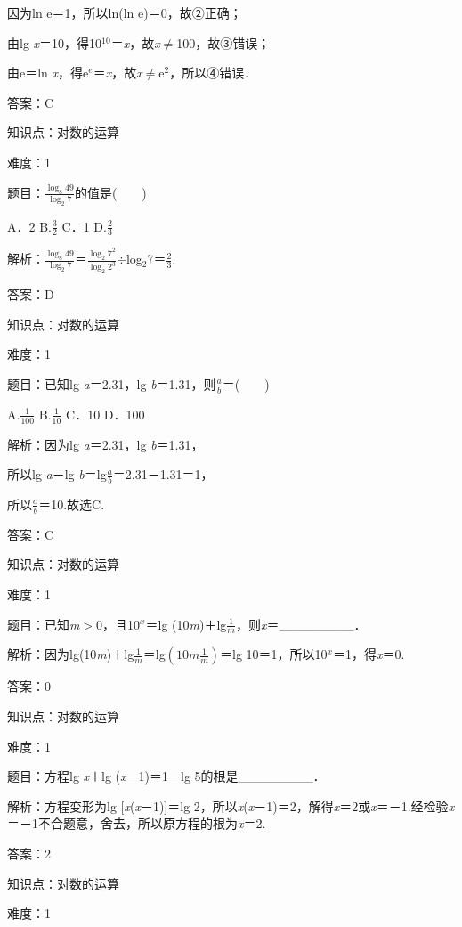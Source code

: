 \documentclass{article} %
\begin{document}
因为ln e＝1，所以ln(ln e)＝0，故②正确；

由lg \textit{x}＝10，得10${}^{10}$＝\textit{x}，故\textit{x}$\mathrm{\neq}$100，故③错误；

由e＝ln \textit{x}，得e${}^{e}$＝\textit{x}，故\textit{x}$\mathrm{\neq}$e${}^{2}$，所以④错误．

答案：C

知识点：对数的运算

难度：1

题目：$\frac{\log_8 49}{\log_2 7}$的值是(　　)

A．2  B.$\frac{3}{2}$  C．1  D.$\frac{2}{3}$

解析：$\frac{\log_8 49}{\log_2 7}$＝$\frac{\log_2 7^{2}}{\log_2 2^{3}}$$\mathrm{\div}$log${}_{2}$7＝$\frac{2}{3}$.

答案：D

知识点：对数的运算

难度：1

题目：已知lg \textit{a}＝2.31，lg \textit{b}＝1.31，则$\frac{a}{b}$＝(　　)

A.$\frac{1}{100}$  B.$\frac{1}{10}$  C．10  D．100

解析：因为lg \textit{a}＝2.31，lg \textit{b}＝1.31，

所以lg \textit{a}－lg \textit{b}＝lg$\frac{a}{b}$＝2.31－1.31＝1，

所以$\frac{a}{b}$＝10.故选C.

答案：C

知识点：对数的运算

难度：1

题目：已知\textit{m}$\mathrm{>}$0，且10\textit{${}^{x}$}＝lg (10\textit{m})＋lg$\frac{1}{m}$，则\textit{x}＝\_\_\_\_\_\_\_\_．

解析：因为lg(10\textit{m})＋lg$\frac{1}{m}$＝lg$(10m\frac{1}{m})$＝lg 10＝1，所以10\textit{${}^{x}$}＝1，得\textit{x}＝0.

答案：0

知识点：对数的运算

难度：1

题目：方程lg \textit{x}＋lg (\textit{x}－1)＝1－lg 5的根是\_\_\_\_\_\_\_\_．

解析：方程变形为lg [\textit{x}(\textit{x}－1)]＝lg 2，所以\textit{x}(\textit{x}－1)＝2，解得\textit{x}＝2或\textit{x}＝－1.经检验\textit{x}＝－1不合题意，舍去，所以原方程的根为\textit{x}＝2.

答案：2

知识点：对数的运算

难度：1
\end{document}
